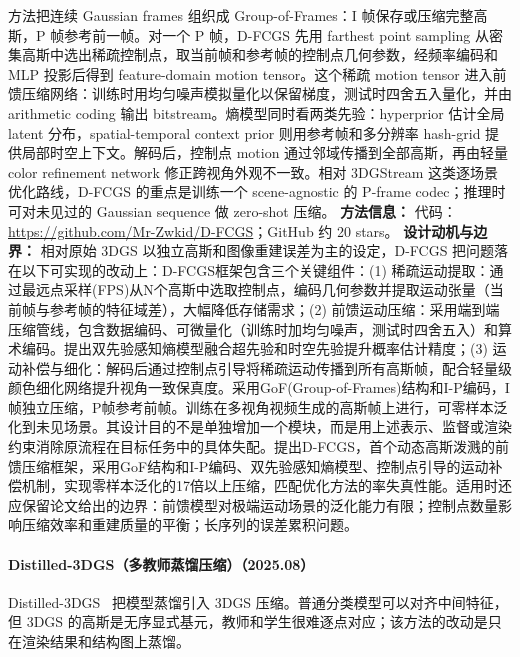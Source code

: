 方法把连续 Gaussian frames 组织成 Group-of-Frames：I 帧保存或压缩完整高斯，P 帧参考前一帧。对一个 P 帧，D-FCGS 先用 farthest point sampling 从密集高斯中选出稀疏控制点，取当前帧和参考帧的控制点几何参数，经频率编码和 MLP 投影后得到 feature-domain motion tensor。这个稀疏 motion tensor 进入前馈压缩网络：训练时用均匀噪声模拟量化以保留梯度，测试时四舍五入量化，并由 arithmetic coding 输出 bitstream。熵模型同时看两类先验：hyperprior 估计全局 latent 分布，spatial-temporal context prior 则用参考帧和多分辨率 hash-grid 提供局部时空上下文。解码后，控制点 motion 通过邻域传播到全部高斯，再由轻量 color refinement network 修正跨视角外观不一致。相对 3DGStream 这类逐场景优化路线，D-FCGS 的重点是训练一个 scene-agnostic 的 P-frame codec；推理时可对未见过的 Gaussian sequence 做 zero-shot 压缩。
\textbf{方法信息：} 代码：\url{https://github.com/Mr-Zwkid/D-FCGS}；GitHub 约 20 stars。
\textbf{设计动机与边界：} 相对原始 3DGS 以独立高斯和图像重建误差为主的设定，D-FCGS 把问题落在以下可实现的改动上：D-FCGS框架包含三个关键组件：(1) 稀疏运动提取：通过最远点采样(FPS)从N个高斯中选取控制点，编码几何参数并提取运动张量（当前帧与参考帧的特征域差），大幅降低存储需求；(2) 前馈运动压缩：采用端到端压缩管线，包含数据编码、可微量化（训练时加均匀噪声，测试时四舍五入）和算术编码。提出双先验感知熵模型融合超先验和时空先验提升概率估计精度；(3) 运动补偿与细化：解码后通过控制点引导将稀疏运动传播到所有高斯帧，配合轻量级颜色细化网络提升视角一致保真度。采用GoF(Group-of-Frames)结构和I-P编码，I帧独立压缩，P帧参考前帧。训练在多视角视频生成的高斯帧上进行，可零样本泛化到未见场景。其设计目的不是单独增加一个模块，而是用上述表示、监督或渲染约束消除原流程在目标任务中的具体失配。提出D-FCGS，首个动态高斯泼溅的前馈压缩框架，采用GoF结构和I-P编码、双先验感知熵模型、控制点引导的运动补偿机制，实现零样本泛化的17倍以上压缩，匹配优化方法的率失真性能。适用时还应保留论文给出的边界：前馈模型对极端运动场景的泛化能力有限；控制点数量影响压缩效率和重建质量的平衡；长序列的误差累积问题。
\paragraph{Distilled-3DGS（多教师蒸馏压缩）（2025.08）}
Distilled-3DGS~\cite{2508_14037} 把模型蒸馏引入 3DGS 压缩。普通分类模型可以对齐中间特征，但 3DGS 的高斯是无序显式基元，教师和学生很难逐点对应；该方法的改动是只在渲染结果和结构图上蒸馏。

